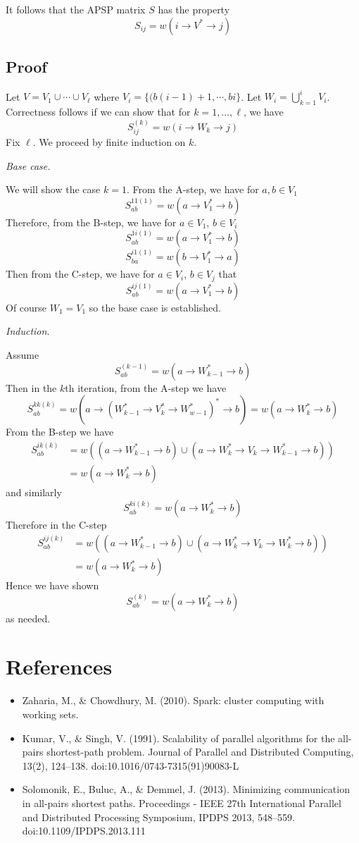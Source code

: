 \documentclass{article} %
\begin{document}
It follows that the APSP matrix $S$ has the property
\[
S_{ij} = w(i \to V^* \to j)
\]

\subsection{Proof}

Let $V = V_1 \cup \cdots \cup V_\ell$ where $V_i = \{(b(i-1) + 1, \cdots, bi\}$.
Let $W_i = \bigcup_{k=1}^i V_i$.
Correctness follows if we can show that for $k = 1,\hdots, \ell$, we have
\[
S^{(k)}_{ij} = w(i \to W_k \to j)
\]
Fix $\ell$. We proceed by finite induction on $k$.

\emph{Base case.}

We will show the case $k = 1$.
From the A-step, we have for $a, b \in V_1$
\[
S^{11(1)}_{ab} = w(a \to V_1^* \to b)
\]
Therefore, from the B-step, we have for $a \in V_1$, $b \in V_i$
\[
S^{1i(1)}_{ab} = w(a \to V_1^* \to b) 
\]
\[
S^{i1(1)}_{ba} = w(b \to V_1^* \to a) 
\]
Then from the C-step, we have for $a \in V_i$, $b \in V_j$ that
\[
S^{ij(1)}_{ab} = w(a \to V_1^* \to b)
\]
Of course $W_1 = V_1$ so the base case is established.

\emph{Induction.}

Assume
\[
S^{(k-1)}_{ab} = w(a \to W_{k-1}^* \to b)
\]
Then in the $k$th iteration, from the A-step we have
\[
S^{kk(k)}_{ab} = w(a \to (W_{k-1}^* \to V_k^* \to W_{w-1}^*)^* \to b) = w(a \to W_k^* \to b)
\]
From the B-step we have
\begin{align*}
S^{ik(k)}_{ab} &= w((a \to W_{k-1}^* \to b) \cup (a \to W_k^* \to V_k \to W_{k-1}^* \to b))\\
&= w(a \to W_k^* \to b)
\end{align*}
and similarly
\[
S^{ki(k)}_{ab} = w(a \to W_k^* \to b)
\]
Therefore in the C-step
\begin{align*}
S^{ij(k)}_{ab} &= w((a \to W_{k-1}^* \to b) \cup (a \to W_k^* \to V_k \to W_k^* \to b))\\
&= w(a \to W_k^* \to b)
\end{align*}
Hence we have shown
\[
S^{(k)}_{ab} = w(a \to W_k^* \to b)
\]
as needed.

\section{References}
\begin{itemize}
\item Zaharia, M., \& Chowdhury, M. (2010). Spark: cluster computing with working sets.
\item Kumar, V., \& Singh, V. (1991). Scalability of parallel algorithms for the all-pairs shortest-path problem. Journal of Parallel and Distributed Computing, 13(2), 124–138. doi:10.1016/0743-7315(91)90083-L
\item Solomonik, E., Buluc, A., \& Demmel, J. (2013). Minimizing communication in all-pairs shortest paths. Proceedings - IEEE 27th International Parallel and Distributed Processing Symposium, IPDPS 2013, 548–559. doi:10.1109/IPDPS.2013.111
\end{itemize}
\end{document}
